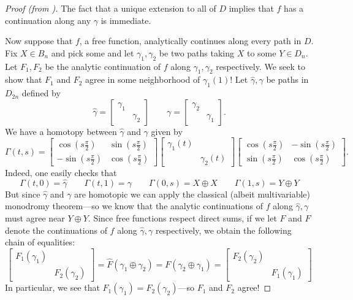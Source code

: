 \begin{proof}
  [Proof (from \cite{bickelPascoe2021})]
  The fact that a unique extension to all of \(D\) implies that \(f\) has a
  continuation along any \(\gamma\) is immediate.

  Now suppose that \(f\), a free function, analytically continues along every
  path in \(D\). Fix \(X \in B_n\) and pick some and let \(\gamma_1,\gamma_2\)
  be two paths taking \(X\) to some \(Y \in D_n\). Let \(F_1,F_2\) be the
  analytic continuation of \(f\) along \(\gamma_1,\gamma_2\) respectively. We
  seek to show that
  \(F_1\) and \(F_2\) agree in some neighborhood of \(\gamma_1(1)\)! Let \(\hat{\gamma}, \gamma\) be paths in
  \(D_{2n}\) defined by
  \[
    \hat{\gamma} = \begin{bmatrix} \gamma_1&\\&\gamma_2 \end{bmatrix} \qquad
    \gamma = \begin{bmatrix} \gamma_2&\\&\gamma_1 \end{bmatrix}.
  \]
  We have a homotopy between \(\hat{\gamma}\) and \(\gamma\) given by
  \[
    \Gamma(t,s) =
    \begin{bmatrix} \cos (s\frac{\pi}{2}) & \sin (s\frac{\pi}{2})\\-\sin (s\frac{\pi}{2}) & \cos (s\frac{\pi}{2}) \end{bmatrix}
    \begin{bmatrix} \gamma_1(t)&\\&\gamma_2(t) \end{bmatrix}
    \begin{bmatrix} \cos (s\frac{\pi}{2}) & -\sin (s\frac{\pi}{2})\\\sin (s\frac{\pi}{2}) & \cos (s\frac{\pi}{2}) \end{bmatrix}.
  \]
  Indeed, one easily checks that
  \[
    \Gamma(t,0) = \hat{\gamma}\qquad
    \Gamma(t,1) = \gamma \quad \quad
    \Gamma(0,s) = X\oplus X\qquad
    \Gamma(1,s) = Y \oplus Y
  \]
  But since \(\hat{\gamma}\) and \(\gamma\) are homotopic we can apply the
  classical (albeit multivariable) monodromy theorem---so we know that the
  analytic continuations of \(f\) along \(\hat{\gamma},\gamma\) must agree near
  \(Y \oplus Y\). Since free functions respect direct sums, if we let
  \(\hat{F}\) and \(F\) denote the continuations of \(f\) along
  \(\hat{\gamma},\gamma\) respectively, we obtain the
  following chain of equalities:
  \[
    \begin{bmatrix} F_1(\gamma_1) &\\&F_2(\gamma_2) \end{bmatrix}  =
    \hat{F}(\gamma_1 \oplus \gamma_2) = F (\gamma_2 \oplus \gamma_1) =
    \begin{bmatrix} F_2(\gamma_2)& \\ & F_1(\gamma_1) \end{bmatrix}
  \]
  In particular, we see that \(F_1(\gamma_1)=F_2(\gamma_2)\)---so \(F_1\) and
  \(F_2\) agree!
\end{proof}

